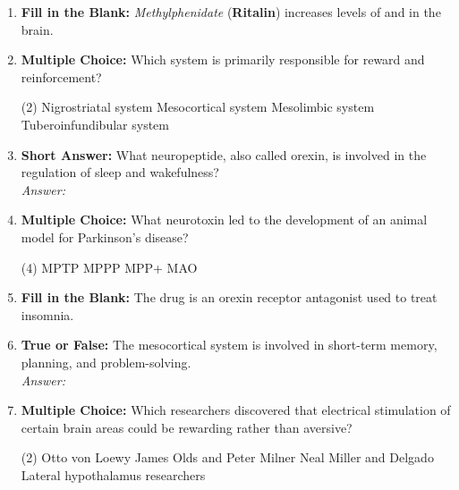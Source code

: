 \begin{enumerate}[label=\textbf{Q3.5.\arabic*}]
    \item \textbf{Fill in the Blank:} \textit{Methylphenidate} (\textbf{Ritalin}) increases levels of \underline{\hspace{3cm}} and \underline{\hspace{3cm}} in the brain.

    \item \textbf{Multiple Choice:} Which system is primarily responsible for reward and reinforcement?
        \begin{tasks}[label=\textcolor{\documentTheme}{(\Alph*)}, item-format=\color{\documentTheme}, label-width=1.5em, item-indent=1.7em](2)
            \task Nigrostriatal system
            \task Mesocortical system
            \task Mesolimbic system
            \task Tuberoinfundibular system
        \end{tasks}

    \item \textbf{Short Answer:} What neuropeptide, also called orexin, is involved in the regulation of sleep and wakefulness? \\
        \textit{Answer:} \\%

    \item \textbf{Multiple Choice:} What neurotoxin led to the development of an animal model for Parkinson's disease?
        \begin{tasks}[label=\textcolor{\documentTheme}{(\Alph*)}, item-format=\color{\documentTheme}, label-width=1.5em, item-indent=1.7em](4)
            \task MPTP
            \task MPPP
            \task MPP+
            \task MAO
        \end{tasks}

    \item \textbf{Fill in the Blank:} The drug \underline{\hspace{3cm}} is an orexin receptor antagonist used to treat insomnia.

    \item \textbf{True or False:} The mesocortical system is involved in short-term memory, planning, and problem-solving. \\
        \textit{Answer:} %

    \item \textbf{Multiple Choice:} Which researchers discovered that electrical stimulation of certain brain areas could be rewarding rather than aversive?
        \begin{tasks}[label=\textcolor{\documentTheme}{(\Alph*)}, item-format=\color{\documentTheme}, label-width=1.5em, item-indent=1.7em](2)
            \task Otto von Loewy
            \task James Olds and Peter Milner
            \task Neal Miller and Delgado
            \task Lateral hypothalamus researchers
        \end{tasks}


\end{enumerate}
